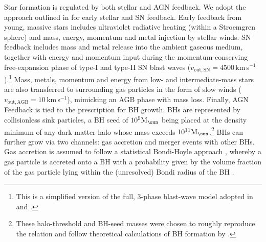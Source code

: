 \documentclass[fleqn,usenatbib]{mnras}
\newcommand{\Msun}{\hbox{M$_\sun$}}
\begin{document}
Star formation is regulated by both stellar and AGN feedback. We adopt
the approach outlined in \citet{Nunez17} for early stellar and SN feedback. 
Early feedback from young, massive stars includes ultraviolet radiative 
heating (within a Stroemgren sphere) and mass, energy,  momentum and 
metal injection by stellar winds. SN feedback includes mass and metal release 
into the ambient gaseous medium, together with energy and momentum
input during the momentum-conserving free-expansion phase of
type-I and type-II SN blast waves ($v_{\mathrm{out,SN}} =
4500\,$km\,s$^{-1}$).\footnote{This is a simplified version of the
  full, 3-phase  blast-wave model adopted in \citet{Nunez17} and
  \citet{Choi16}.} Mass, metals,  momentum and energy from low- and
intermediate-mass stars are also transferred  to surrounding gas
particles in the form of slow winds ($v_{\mathrm{out,AGB}} =
10\,$km\,s$^{-1}$), mimicking an AGB phase with mass loss. Finally,
AGN Feedback is tied to the prescription for BH growth.  BHs are
represented by collisionless sink particles, a BH seed of $10^5\Msun$
being placed at the density minimum of any dark-matter halo whose mass
exceeds $10^{11}\Msun$.\footnote{These halo-threshold and  BH-seed
  masses were chosen to roughly reproduce the \citet{Magorrian98}
  relation and  follow theoretical calculations of BH formation by
  \citet{Stone16}.} BHs can further grow via two channels: gas
accretion and merger events with other BHs. Gas accretion is assumed
to follow a statistical Bondi-Hoyle approach  \citep{Bondi52}, whereby
a gas particle is accreted onto a BH with a probability given by the
volume fraction of the gas particle lying within the (unresolved)
Bondi radius of the BH \citep[e.g.,][]{Choi12}.  
\end{document}
